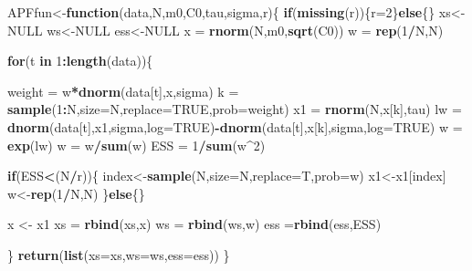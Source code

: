 \documentclass[
]{book}
\newenvironment{Shaded}{\begin{snugshade}}{\end{snugshade}}
\newcommand{\ControlFlowTok}[1]{\textcolor[rgb]{0.13,0.29,0.53}{\textbf{#1}}}
\newcommand{\DataTypeTok}[1]{\textcolor[rgb]{0.13,0.29,0.53}{#1}}
\newcommand{\DecValTok}[1]{\textcolor[rgb]{0.00,0.00,0.81}{#1}}
\newcommand{\KeywordTok}[1]{\textcolor[rgb]{0.13,0.29,0.53}{\textbf{#1}}}
\newcommand{\NormalTok}[1]{#1}
\newcommand{\OperatorTok}[1]{\textcolor[rgb]{0.81,0.36,0.00}{\textbf{#1}}}
\newcommand{\OtherTok}[1]{\textcolor[rgb]{0.56,0.35,0.01}{#1}}
\newcommand{\StringTok}[1]{\textcolor[rgb]{0.31,0.60,0.02}{#1}}
\theoremstyle{break}
\theoremstyle{nonumberplain}
\begin{document}
\begin{Shaded}
\begin{Highlighting}[]
\NormalTok{APFfun<-}\ControlFlowTok{function}\NormalTok{(data,N,m0,C0,tau,sigma,r)\{}
  \ControlFlowTok{if}\NormalTok{(}\KeywordTok{missing}\NormalTok{(r))\{r=}\DecValTok{2}\NormalTok{\}}\ControlFlowTok{else}\NormalTok{\{\}}
\NormalTok{  xs<-}\OtherTok{NULL}
\NormalTok{  ws<-}\OtherTok{NULL}
\NormalTok{  ess<-}\OtherTok{NULL}
\NormalTok{  x  =}\StringTok{ }\KeywordTok{rnorm}\NormalTok{(N,m0,}\KeywordTok{sqrt}\NormalTok{(C0))}
\NormalTok{  w  =}\StringTok{ }\KeywordTok{rep}\NormalTok{(}\DecValTok{1}\OperatorTok{/}\NormalTok{N,N)}
  
  \ControlFlowTok{for}\NormalTok{(t }\ControlFlowTok{in} \DecValTok{1}\OperatorTok{:}\KeywordTok{length}\NormalTok{(data))\{}
    
\NormalTok{    weight =}\StringTok{ }\NormalTok{w}\OperatorTok{*}\KeywordTok{dnorm}\NormalTok{(data[t],x,sigma)}
\NormalTok{    k   =}\StringTok{ }\KeywordTok{sample}\NormalTok{(}\DecValTok{1}\OperatorTok{:}\NormalTok{N,}\DataTypeTok{size=}\NormalTok{N,}\DataTypeTok{replace=}\OtherTok{TRUE}\NormalTok{,}\DataTypeTok{prob=}\NormalTok{weight)}
\NormalTok{    x1   =}\StringTok{ }\KeywordTok{rnorm}\NormalTok{(N,x[k],tau)}
\NormalTok{    lw  =}\StringTok{ }\KeywordTok{dnorm}\NormalTok{(data[t],x1,sigma,}\DataTypeTok{log=}\OtherTok{TRUE}\NormalTok{)}\OperatorTok{-}\KeywordTok{dnorm}\NormalTok{(data[t],x[k],sigma,}\DataTypeTok{log=}\OtherTok{TRUE}\NormalTok{)}
\NormalTok{    w   =}\StringTok{ }\KeywordTok{exp}\NormalTok{(lw)}
\NormalTok{    w   =}\StringTok{ }\NormalTok{w}\OperatorTok{/}\KeywordTok{sum}\NormalTok{(w)}
\NormalTok{    ESS  =}\StringTok{ }\DecValTok{1}\OperatorTok{/}\KeywordTok{sum}\NormalTok{(w}\OperatorTok{^}\DecValTok{2}\NormalTok{)}
    
    \ControlFlowTok{if}\NormalTok{(ESS}\OperatorTok{<}\NormalTok{(N}\OperatorTok{/}\NormalTok{r))\{}
\NormalTok{      index<-}\KeywordTok{sample}\NormalTok{(N,}\DataTypeTok{size=}\NormalTok{N,}\DataTypeTok{replace=}\NormalTok{T,}\DataTypeTok{prob=}\NormalTok{w)}
\NormalTok{      x1<-x1[index]}
\NormalTok{      w<-}\KeywordTok{rep}\NormalTok{(}\DecValTok{1}\OperatorTok{/}\NormalTok{N,N)}
\NormalTok{    \}}\ControlFlowTok{else}\NormalTok{\{\}}
    
\NormalTok{    x <-}\StringTok{ }\NormalTok{x1}
\NormalTok{    xs =}\StringTok{ }\KeywordTok{rbind}\NormalTok{(xs,x)}
\NormalTok{    ws =}\StringTok{ }\KeywordTok{rbind}\NormalTok{(ws,w)}
\NormalTok{    ess =}\KeywordTok{rbind}\NormalTok{(ess,ESS)}
    
\NormalTok{  \}}
  \KeywordTok{return}\NormalTok{(}\KeywordTok{list}\NormalTok{(}\DataTypeTok{xs=}\NormalTok{xs,}\DataTypeTok{ws=}\NormalTok{ws,}\DataTypeTok{ess=}\NormalTok{ess))}
\NormalTok{\}}
\end{Highlighting}
\end{Shaded}
\end{document}
